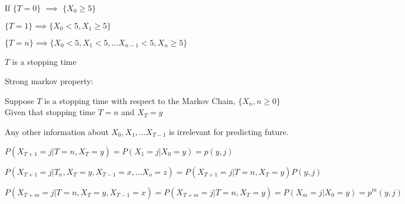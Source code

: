 \documentclass{article}
\begin{document}
If $\{T =0 \}$ $\implies$ $ \{X_0 \geq 5 \}$

$\{ T= 1\} \implies \{X_0 <5, X_1 \geq 5 \}$

$ \{ T=n \} \implies \{X_0 <5, X_1<5, \dots X_{n-1} < 5, X_n \geq 5\}$

$T$ is a stopping time

Strong markov property: 

Suppose $T$ is a stopping time with respect to the Markov Chain, $\{X_n, n \geq 0\}$ Given that stopping time $T=n$ and $X_T=y$

Any other information about $X_0, X_1, \dots X_{T-1}$ is irrelevant for predicting future. 

$P(X_{T+1} =j | T=n, X_T=y) = P(X_1=j|X_0=y) = p(y,j)$

$P(X_{T+1} = j|T_n,X_T=y,X_{T-1}=x, \dots X_o=z) = P(X_{T+1}=j | T=n, X_T=y)P(y,j)$


$P(X_{T+m} = j|T=n, X_T=y, X_{T-1}=x) = P(X_{T+m} = j|T=n, X_T=y) = P(X_m=j|X_0=y) = p^m(y,j)$
\end{document}
